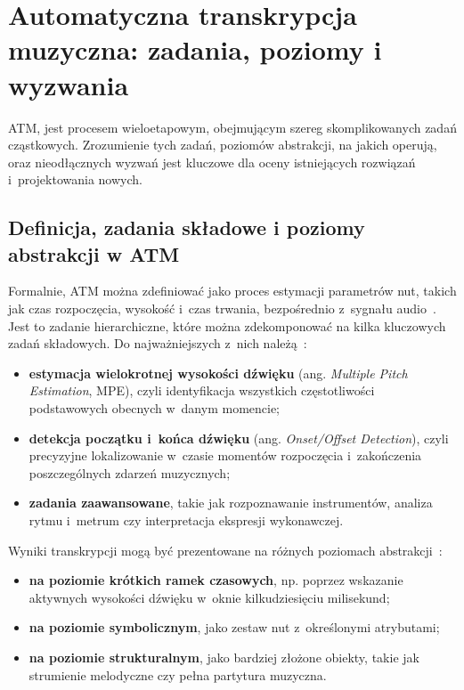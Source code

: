 \section{Automatyczna transkrypcja muzyczna: zadania, poziomy i wyzwania}
\label{sec:rdzen_atm}

ATM, jest procesem wieloetapowym, obejmującym szereg skomplikowanych zadań cząstkowych. Zrozumienie tych zadań, poziomów abstrakcji, na jakich operują, oraz nieodłącznych wyzwań jest kluczowe dla oceny istniejących rozwiązań i~projektowania nowych.

\subsection{Definicja, zadania składowe i poziomy abstrakcji w ATM}
\label{ssec:definicja_zadania_poziomy_atm}

Formalnie, ATM można zdefiniować jako proces estymacji parametrów nut, takich jak czas rozpoczęcia, wysokość i~czas trwania, bezpośrednio z~sygnału audio~\autocite{KlapuriDavy2006SignalProcessing,Benetos2019AutomaticMusicTranscription}. Jest to zadanie hierarchiczne, które można zdekomponować na kilka kluczowych zadań składowych. Do najważniejszych z~nich należą~\autocite{Benetos2019AutomaticMusicTranscription,Hawthorne2018Onsets}:
\begin{itemize}
    \item \textbf{estymacja wielokrotnej wysokości dźwięku} (ang. \textit{Multiple Pitch Estimation}, MPE), czyli identyfikacja wszystkich częstotliwości podstawowych obecnych w~danym momencie;
    \item \textbf{detekcja początku i~końca dźwięku} (ang. \textit{Onset/Offset Detection}), czyli precyzyjne lokalizowanie w~czasie momentów rozpoczęcia i~zakończenia poszczególnych zdarzeń muzycznych;
    \item \textbf{zadania zaawansowane}, takie jak rozpoznawanie instrumentów, analiza rytmu i~metrum czy interpretacja ekspresji wykonawczej.
\end{itemize}

Wyniki transkrypcji mogą być prezentowane na różnych poziomach abstrakcji~\autocite{Benetos2019AutomaticMusicTranscription}:
\begin{itemize}
    \item \textbf{na poziomie krótkich ramek czasowych}, np. poprzez wskazanie aktywnych wysokości dźwięku w~oknie kilkudziesięciu milisekund;
    \item \textbf{na poziomie symbolicznym}, jako zestaw nut z~określonymi atrybutami;
    \item \textbf{na poziomie strukturalnym}, jako bardziej złożone obiekty, takie jak strumienie melodyczne czy pełna partytura muzyczna.
\end{itemize}

